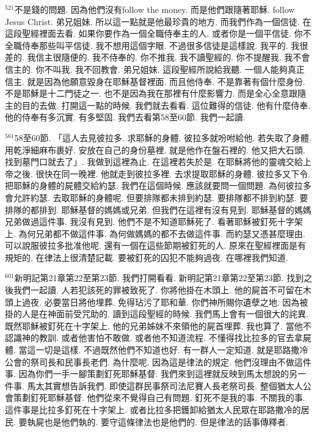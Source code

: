 \documentclass{book}
\begin{document}
$^{521}$不是錢的問題.
因為他們沒有follow the money.
而是他們跟隨著耶穌.
follow Jesus Christ.
弟兄姐妹.
所以這一點就是他最珍貴的地方.
而我們作為一個信徒.
在這段聖經裡面去看.
如果你要作為一個全職侍奉主的人.
或者你是一個平信徒.
你不全職侍奉那些叫平信徒.
我不想用這個字眼.
不過很多信徒是這樣說.
我平的.
我很差的.
我信主很隨便的.
我不侍奉的.
你不推我.
我不讀聖經的.
你不提醒我.
我不會信主的.
你不叫我.
我不回教會.
弟兄姐妹.
這段聖經所說給我聽.
一個人能夠真正信主.
就是因為他願意毀身在耶穌基督裡面.
而且他侍奉.
不是靠著有個什麼身份.
不是耶穌是十二門徒之一.
也不是因為我在那裡有什麼影響力.
而是全心全意跟隨主的目的去做.
打開這一點的時候.
我們就去看看.
這位難得的信徒.
他有什麼侍奉.
他的侍奉有多沉實.
有多堅固.
我們去看第58至60節.
我們一起讀.

$^{561}$58至60節.
「這人去見彼拉多.
求耶穌的身體.
彼拉多就吩咐給他.
若失取了身體.
用乾淨細麻布裹好.
安放在自己的身份墓裡.
就是他作在盤石裡的.
他又把大石頭.
找到墓門口就去了」.
我做到這裡為止.
在這裡若失於是.
在耶穌將他的靈魂交給上帝之後.
很快在同一晚裡.
他就走到彼拉多裡.
去求提取耶穌的身體.
彼拉多又下令.
把耶穌的身體的屍體交給約瑟.
我們在這個時候.
應該就要問一個問題.
為何彼拉多會允許約瑟.
去取耶穌的身體呢.
但要排隊都未排到約瑟.
要排隊都不排到約瑟.
要排隊的都排到.
耶穌基督的媽媽或兄弟.
但我們在這裡有沒有見到.
耶穌基督的媽媽兄弟做過這件事.
我沒有見到.
他們不是不知道耶穌死了.
看著耶穌被釘死十字架上.
為何兄弟都不做這件事.
為何做媽媽的都不去做這件事.
而約瑟又憑甚麼理由.
可以說服彼拉多批准他呢.
還有一個在這些節期被釘死的人.
原來在聖經裡面是有規矩的.
在律法上很清楚記載.
要被釘死的囚犯不能夠過夜.
在哪裡我們知道.

$^{601}$新明記第21章第22至第23節.
我們打開看看.
新明記第21章第22至第23節.
找到之後我們一起讀.
人若犯該死的罪被致死了.
你將他掛在木頭上.
他的屍首不可留在木頭上過夜.
必要當日將他埋葬.
免得玷污了耶和華.
你們神所賜你遺孽之地.
因為被掛的人是在神面前受咒助的.
讀到這段聖經的時候.
我們馬上會有一個很大的詫異.
既然耶穌被釘死在十字架上.
他的兄弟姊妹不來領他的屍首埋葬.
我也算了.
當他不認識神的教訓.
或者他害怕不敢做.
或者他不知道流程.
不懂得找比拉多的官去拿屍體.
當這一切是這樣.
不過既然他們不知道也好.
有一群人一定知道.
就是耶路撒冷公會的祭司長和民事長老們.
為什麼呢.
因為這是律法的規定.
他們沒理由不做這件事.
因為你們一手一腳策劃釘死耶穌基督.
我們來到這裡就反映到馬太想說的另一件事.
馬太其實想告訴我們.
即使這群民事祭司法尼賽人長老祭司長.
整個猶太人公會策劃釘死耶穌基督.
他們從來不覺得自己有問題.
釘死不是我的事.
不關我的事.
這件事是比拉多釘死在十字架上.
或者比拉多把鑊卸給猶太人民眾在耶路撒冷的居民.
要執屍也是他們執的.
要守這條律法也是他們的.
但是律法的話事傳釋者.
\end{document}
